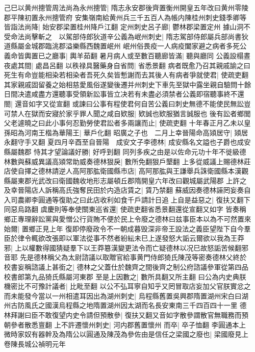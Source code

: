 己巳以黄州摠管周法尚為永州摠管|{
	隋志永安郡後齊置衡州開皇五年改曰黄州零陵郡平陳初置永州摠管府}
安集嶺南給黄州兵三千五百人為帳内陳桂州刺史錢季卿等皆詣法尚降|{
	始安郡梁置桂州降戶江翻}
定州刺史呂子廊|{
	鬱林郡梁置定州}
據山洞不受命法尚擊斬之　以駕部侍郎狄道辛公義為岷州刺史|{
	隋志駕部侍郎屬兵部尚書狄道縣屬金城郡臨洮郡溢樂縣西魏置岷州}
岷州俗畏疫一人病疫闔家避之病者多死公義命皆輿置已之廳事|{
	輿羊茹翻}
暑月病人或至數百聽廊皆滿|{
	聽與廳同}
公義設榻晝夜處其間|{
	處昌呂翻}
以秩禄具醫藥身自省問|{
	省悉景翻}
病者既愈乃召其親戚諭之曰死生有命豈能相染若相染者吾死久矣皆慙謝而去其後人有病者爭就使君|{
	使疏吏翻}
其家親戚固留養之始相慈愛風俗遂變後遷并州刺史下車先至獄中露坐親自驗問十餘日間决遣咸盡方還聽事受領新訟事皆立决若有未盡必須禁者公義即宿聽事終不還閤|{
	還音如字又從宣翻}
或諫曰公事有程使君何自苦公義曰刺史無德不能使民無訟豈可禁人在獄而安寢於家乎罪人聞之咸自欵服|{
	欵誠也欵服猶言誠服也}
後有訟者鄉閭父老遽曉之曰此小事何忍勤勞使君訟者多兩讓而止|{
	使疏吏翻}
十年春正月乙未以皇孫昭為河南王楷為華陽王|{
	華戶化翻}
昭廣之子也　二月上幸晉陽命高熲居守|{
	熲居永翻守手又翻}
夏四月辛酉至自晉陽　成安文子李德林|{
	成安縣名文謚也子爵也成安縣屬魏郡}
恃其才望論議好勝|{
	好呼到翻}
同列多疾之由是以佐命元功十年不徙級德林數與蘇威異議高熲常助威奏德林狠戾|{
	數所免翻狠戶墾翻}
上多從威議上賜德林莊店使自擇之德林請逆人高阿那肱衛國縣市店|{
	高阿那肱與王謙舉兵誅衛國縣本漢觀縣屬東郡光武改曰衛國魏收地形志屬頓丘郡隋開皇六年改曰觀城屬武陽郡}
上許之及幸晉陽店人訴稱高氏強奪民田於内造店賃之|{
	賃乃禁翻}
蘇威因奏德林誣罔妄奏自入司農卿李圓通等復助之曰此店收利如食千戶請計日追上自是益惡之|{
	復扶又翻下同惡烏路翻}
虞慶則等奉使關東巡省還|{
	使疏吏翻省悉景翻還從宣翻又如字}
皆奏稱鄉正專理辭訟黨與愛憎公行貨賄不便於民上令廢之德林曰兹事臣本以為不可然置來始爾|{
	置鄉正見上年}
復即停廢政令不一朝成暮毁深非帝王設法之義臣望陛下自今羣臣於律令輒欲改張即以軍法從事不然者紛紜未巳上遂發怒大詬云爾欲以我為王莽邪|{
	上以權數得國猜疑羣下以王莽簒漢變更法令而亡疑德林以况巳故怒詬苦候翻邪音耶}
先是德林稱父為太尉諮議以取贈官給事黄門侍郎猗氏陳茂等密奏德林父終於校書妄稱諮議上甚銜之|{
	德林之父蓋仕於魏齊之間後齊之制公府諮議參軍從第四品校書郎第九品猗氏縣屬河東郡}
至是上因數之|{
	數所具翻又所主翻}
曰公為内史典朕機密比不可豫計議者|{
	比毗至翻}
以公不弘耳寧自知乎又罔冒取店妄加父官朕實忿之而未能發今當以一州相遣耳因出為湖州刺史|{
	烏程縣舊置吳興郡隋置湖州宋白曰湖州古防風氏之國漢烏程縣之地隋置湖州因太湖而名長安東南三千四百四十一里}
德林拜謝曰臣不敢復望内史令請但預散參|{
	復扶又翻又音如字散參謂散官無職務而預朝參者散悉亶翻}
上不許遷懷州刺史|{
	河内郡舊置懷州}
而卒|{
	卒子恤翻}
李圓通本上微時家奴有器幹及為隋公以圓通及陳茂為參佐由是信任之梁國之廢也|{
	梁國廢見上卷陳長城公禎明元年}
